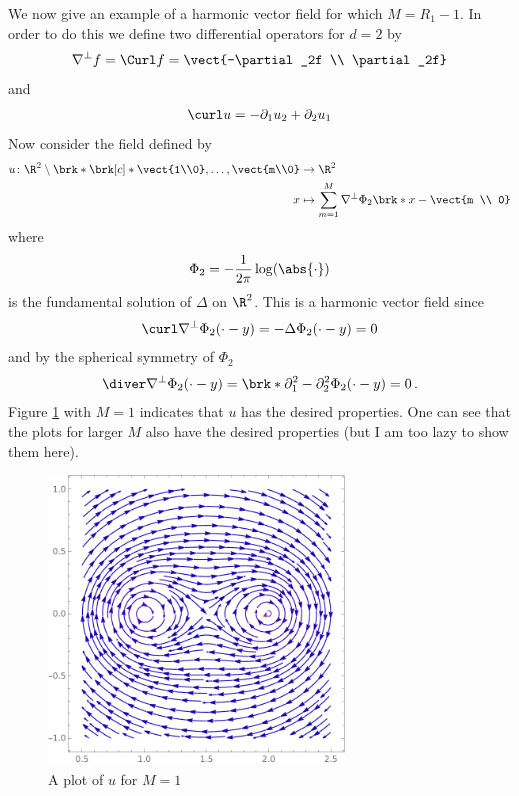 We now give an example of a harmonic vector field
for which $M=R_1-1$. In order to do this we define two differential operators for $d=2$ by
\begin{align*}
  \nabla^\perp f=\Curl f=\vect{-\partial_2f \\ \partial_2f}
\end{align*}
and
\begin{align*}
  \curl u=-\partial_1u_2+\partial_2u_1
\end{align*}
Now consider the field defined by
\begin{align*}
  u\colon\R^2\setminus\brk*{\brk[c]*{\vect{1\\0},\dots,\vect{m\\0}}}&\to\R^2 \\
  x&\mapsto\sum_{m=1}^M\nabla^\perp\Phi_2\brk*{x-\vect{m \\ 0}}
\end{align*}
where
\begin{align*}
  \Phi_2=-\frac{1}{2\pi}\log(\abs{\cdot})
\end{align*}
is the fundamental solution of $\Delta$ on $\R^2$. This is a harmonic vector field since
\begin{align*}
  \curl \nabla^\perp\Phi_2(\cdot-y)= -\Delta\Phi_2(\cdot-y)=0
\end{align*}
and by the spherical symmetry of $\Phi_2$
\begin{align*}
  \diver \nabla^\perp\Phi_2(\cdot-y) = \brk*{\partial_1^2-\partial_2^2}\Phi_2(\cdot-y)=0\,.
\end{align*}
Figure \ref{pl:n2_hvf_noInflowNoOutflow} with $M=1$ indicates that $u$ has the desired properties. One can see that
the plots for larger
$M$ also have the desired properties (but I am too lazy to show them here).
\begin{figure}
  \centering
  \includegraphics[width=0.7\textwidth]{../Plots/n2_hvf_noInflowNoOutflow_asymmetric.pdf}
  \caption{A plot of $u$ for $M=1$ }
  \label{pl:n2_hvf_noInflowNoOutflow}
\end{figure}

